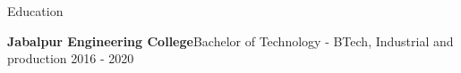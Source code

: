 \documentclass{resume} %
\begin{document}
    \begin{rSection}{Education}
    
\begin{rSubsectionNoBullet}{\bf Jabalpur Engineering College}{}{Bachelor of Technology - BTech, Industrial and production }{2016 - 2020}
\end{rSubsectionNoBullet}
\hfill
\end{rSection}
\end{document}
